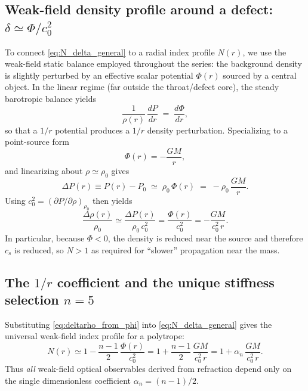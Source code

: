 \documentclass[11pt]{article}
\begin{document}
\subsection{Weak-field density profile around a defect: $\delta\simeq \Phi/c_0^2$}

To connect \eqref{eq:N_delta_general} to a radial index profile $N(r)$, we use the weak-field static balance employed throughout the series: the background density is slightly perturbed by an effective scalar potential $\Phi(r)$ sourced by a central object. In the linear regime (far outside the throat/defect core), the steady barotropic balance yields
\begin{equation}
\frac{1}{\rho(r)}\,\frac{dP}{dr} \;=\; \frac{d\Phi}{dr},
\label{eq:hydrostatic_balance}
\end{equation}
so that a $1/r$ potential produces a $1/r$ density perturbation. Specializing to a point-source form
\begin{equation}
\Phi(r) = -\frac{GM}{r},
\label{eq:Phi_point}
\end{equation}
and linearizing about $\rho\simeq\rho_0$ gives
\begin{equation}
\Delta P(r) \equiv P(r)-P_0
\;\simeq\;
\rho_0\,\Phi(r)
\;=\;
-\rho_0\,\frac{GM}{r}.
\label{eq:deltaP_from_phi}
\end{equation}
Using $c_0^2=(\partial P/\partial\rho)_{\rho_0}$ then yields
\begin{equation}
\frac{\Delta\rho(r)}{\rho_0}
\simeq
\frac{\Delta P(r)}{\rho_0\,c_0^2}
=
\frac{\Phi(r)}{c_0^2}
=
-\frac{GM}{c_0^2\,r}.
\label{eq:deltarho_from_phi}
\end{equation}
In particular, because $\Phi<0$, the density is reduced near the source and therefore $c_s$ is reduced, so $N>1$ as required for ``slower'' propagation near the mass. 

\subsection{The $1/r$ coefficient and the unique stiffness selection $n=5$}

Substituting \eqref{eq:deltarho_from_phi} into \eqref{eq:N_delta_general} gives the universal weak-field index profile for a polytrope:
\begin{equation}
N(r)
\simeq
1-\frac{n-1}{2}\,\frac{\Phi(r)}{c_0^2}
=
1+\frac{n-1}{2}\,\frac{GM}{c_0^2\,r}
=
1+\alpha_n\,\frac{GM}{c_0^2\,r}.
\label{eq:N_r_general_n}
\end{equation}
Thus \emph{all} weak-field optical observables derived from refraction depend only on the single dimensionless coefficient $\alpha_n=(n-1)/2$. 
\end{document}
